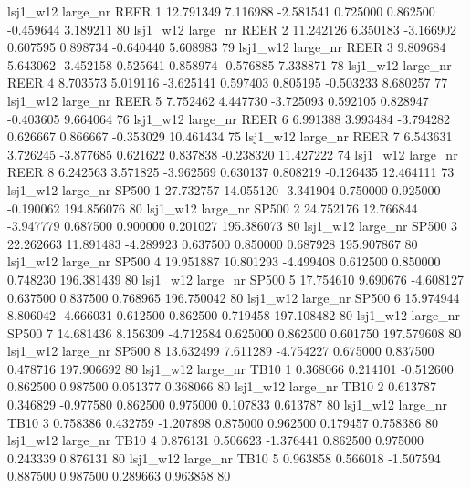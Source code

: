     lsj1_w12   large_nr     REER                 1 12.791349  7.116988  -2.581541 0.725000 0.862500 -0.459644    3.189211 80
    lsj1_w12   large_nr     REER                 2 11.242126  6.350183  -3.166902 0.607595 0.898734 -0.640440    5.608983 79
    lsj1_w12   large_nr     REER                 3  9.809684  5.643062  -3.452158 0.525641 0.858974 -0.576885    7.338871 78
    lsj1_w12   large_nr     REER                 4  8.703573  5.019116  -3.625141 0.597403 0.805195 -0.503233    8.680257 77
    lsj1_w12   large_nr     REER                 5  7.752462  4.447730  -3.725093 0.592105 0.828947 -0.403605    9.664064 76
    lsj1_w12   large_nr     REER                 6  6.991388  3.993484  -3.794282 0.626667 0.866667 -0.353029   10.461434 75
    lsj1_w12   large_nr     REER                 7  6.543631  3.726245  -3.877685 0.621622 0.837838 -0.238320   11.427222 74
    lsj1_w12   large_nr     REER                 8  6.242563  3.571825  -3.962569 0.630137 0.808219 -0.126435   12.464111 73
    lsj1_w12   large_nr    SP500                 1 27.732757 14.055120  -3.341904 0.750000 0.925000 -0.190062  194.856076 80
    lsj1_w12   large_nr    SP500                 2 24.752176 12.766844  -3.947779 0.687500 0.900000  0.201027  195.386073 80
    lsj1_w12   large_nr    SP500                 3 22.262663 11.891483  -4.289923 0.637500 0.850000  0.687928  195.907867 80
    lsj1_w12   large_nr    SP500                 4 19.951887 10.801293  -4.499408 0.612500 0.850000  0.748230  196.381439 80
    lsj1_w12   large_nr    SP500                 5 17.754610  9.690676  -4.608127 0.637500 0.837500  0.768965  196.750042 80
    lsj1_w12   large_nr    SP500                 6 15.974944  8.806042  -4.666031 0.612500 0.862500  0.719458  197.108482 80
    lsj1_w12   large_nr    SP500                 7 14.681436  8.156309  -4.712584 0.625000 0.862500  0.601750  197.579608 80
    lsj1_w12   large_nr    SP500                 8 13.632499  7.611289  -4.754227 0.675000 0.837500  0.478716  197.906692 80
    lsj1_w12   large_nr     TB10                 1  0.368066  0.214101  -0.512600 0.862500 0.987500  0.051377    0.368066 80
    lsj1_w12   large_nr     TB10                 2  0.613787  0.346829  -0.977580 0.862500 0.975000  0.107833    0.613787 80
    lsj1_w12   large_nr     TB10                 3  0.758386  0.432759  -1.207898 0.875000 0.962500  0.179457    0.758386 80
    lsj1_w12   large_nr     TB10                 4  0.876131  0.506623  -1.376441 0.862500 0.975000  0.243339    0.876131 80
    lsj1_w12   large_nr     TB10                 5  0.963858  0.566018  -1.507594 0.887500 0.987500  0.289663    0.963858 80
